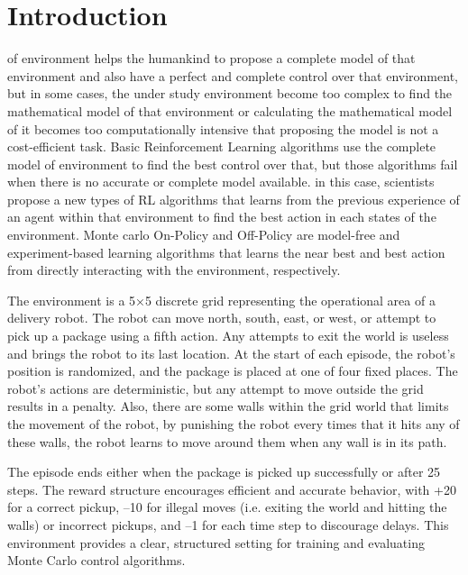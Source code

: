 \documentclass[lettersize,journal]{IEEEtran}
\begin{document}
\section{Introduction}
 of environment helps the humankind to propose a complete model of that environment and also have a perfect and complete control over that environment, but in some cases, the under study environment become too complex to find the mathematical model of that environment or calculating the mathematical model of it becomes too computationally intensive that proposing the model is not a cost-efficient task. Basic Reinforcement Learning algorithms use the complete model of environment to find the best control over that, but those algorithms fail when there is no accurate or complete model available. in this case, scientists propose a new types of RL algorithms that learns from the previous experience of an agent within that environment to find the best action in each states of the environment. Monte carlo On-Policy and Off-Policy are model-free and experiment-based learning algorithms that learns the near best and best action from directly interacting with the environment, respectively.\par

The environment is a 5×5 discrete grid representing the operational area of a delivery robot. The robot can move north, south, east, or west, or attempt to pick up a package using a fifth action. Any attempts to exit the world is useless and brings the robot to its last location. At the start of each episode, the robot's position is randomized, and the package is placed at one of four fixed places. The robot's actions are deterministic, but any attempt to move outside the grid results in a penalty. Also, there are some walls within the grid world that limits the movement of the robot, by punishing the robot every times that it hits any of these walls, the robot learns to move around them when any wall is in its path.\par

The episode ends either when the package is picked up successfully or after 25 steps. The reward structure encourages efficient and accurate behavior, with +20 for a correct pickup, –10 for illegal moves (i.e. exiting the world and hitting the walls) or incorrect pickups, and –1 for each time step to discourage delays. This environment provides a clear, structured setting for training and evaluating Monte Carlo control algorithms. \par
\end{document}
